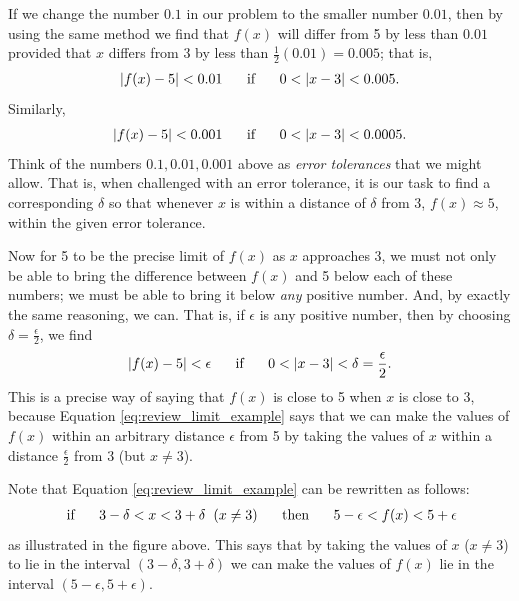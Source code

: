 \documentclass[12pt,letterpaper,reqno]{article}
\numberwithin{equation}{section}
\begin{document}
{If we change the number $0.1$ in our problem to the smaller number $0.01$, then by using the same method we find that $f(x)$ will differ from 5 by less than $0.01$ provided that $x$ differs from 3 by less than $\frac{1}{2}(0.01)=0.005$; that is,
\begin{align*}
	|f(x)-5|<0.01 \hspace{0.5cm} \text{ if } \hspace{0.5cm} 0<|x-3|<0.005.
\end{align*}
Similarly,
\begin{align*}
	|f(x)-5|<0.001 \hspace{0.5cm} \text{ if } \hspace{0.5cm} 0<|x-3|<0.0005.
\end{align*}
Think of the numbers $0.1, 0.01, 0.001$ above as \emph{error tolerances} that we might allow. That is, when challenged with an error tolerance, it is our task to find a corresponding $\delta$ so that whenever $x$ is within a distance of $\delta$ from 3, $f(x)\approx 5$, within the given error tolerance. 

Now for 5 to be the precise limit of $f(x)$ as $x$ approaches 3, we must not only be able to bring the difference between $f(x)$ and 5 below each of these numbers; we must be able to bring it below \emph{any} positive number. And, by exactly the same reasoning, we can. That is, if $\epsilon$ is any positive number, then by choosing $\delta=\frac{\epsilon
}{2}$, we find
\begin{align}\label{eq:review_limit_example}
	|f(x)-5|<\epsilon \hspace{0.5cm} \text{ if } \hspace{0.5cm} 0<|x-3|<\delta=\frac{\epsilon}{2}.
\end{align}
This is a precise way of saying that $f(x)$ is close to 5 when $x$ is close to 3, because Equation \eqref{eq:review_limit_example} says that we can make the values of $f(x)$ within an arbitrary distance $\epsilon$ from 5 by taking the values of $x$ within a distance $\frac{\epsilon}{2}$ from 3 (but $x \neq 3$).

Note that Equation \eqref{eq:review_limit_example} can be rewritten as follows:
\begin{align*}
	\text{ if } \hspace{0.5cm} 3-\delta<x<3+\delta \hspace{0.2cm} (x \neq 3) \hspace{0.5cm} \text{ then } \hspace{0.5cm} 5-\epsilon<f(x)<5+\epsilon
\end{align*}
as illustrated in the figure above. This says that by taking the values of $x$ ($x \neq 3$) to lie in the interval $(3-\delta,3+\delta)$ we can make the values of $f(x)$ lie in the interval $(5-\epsilon,5+\epsilon)$.

}
\end{document}
